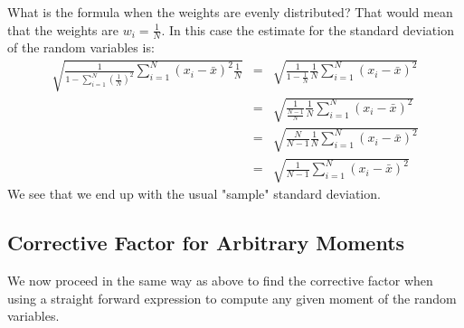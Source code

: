\documentclass{article}
\begin{document}
What is the formula when the weights are evenly distributed? That would mean that the weights are $w_i = \frac{1}{N}$.
In this case the estimate for the standard deviation of the random variables is:
\begin{eqnarray*}
     \sqrt{\frac{1}{1 - \sum_{i=1}^N \left(\frac{1}{N}\right)^2} \sum_{i=1}^N (x_i - {\bar x})^2 \frac{1}{N}} 
                   & = & \sqrt{\frac{1}{1 - \frac{1}{N}} \frac{1}{N} \sum_{i=1}^N (x_i - {\bar x})^2 } \\
                   & = & \sqrt{\frac{1}{\frac{N - 1}{N}} \frac{1}{N} \sum_{i=1}^N (x_i - {\bar x})^2 } \\
                   & = & \sqrt{\frac{N}{N - 1} \frac{1}{N} \sum_{i=1}^N (x_i - {\bar x})^2 } \\
                   & = & \sqrt{\frac{1}{N - 1} \sum_{i=1}^N (x_i - {\bar x})^2 }
\end{eqnarray*}
We see that we end up with the usual "sample" standard deviation.

\subsection{Corrective Factor for Arbitrary Moments}

We now proceed in the same way as above to find the corrective factor when using a straight forward
expression to compute any given moment of the random variables.
\end{document}
